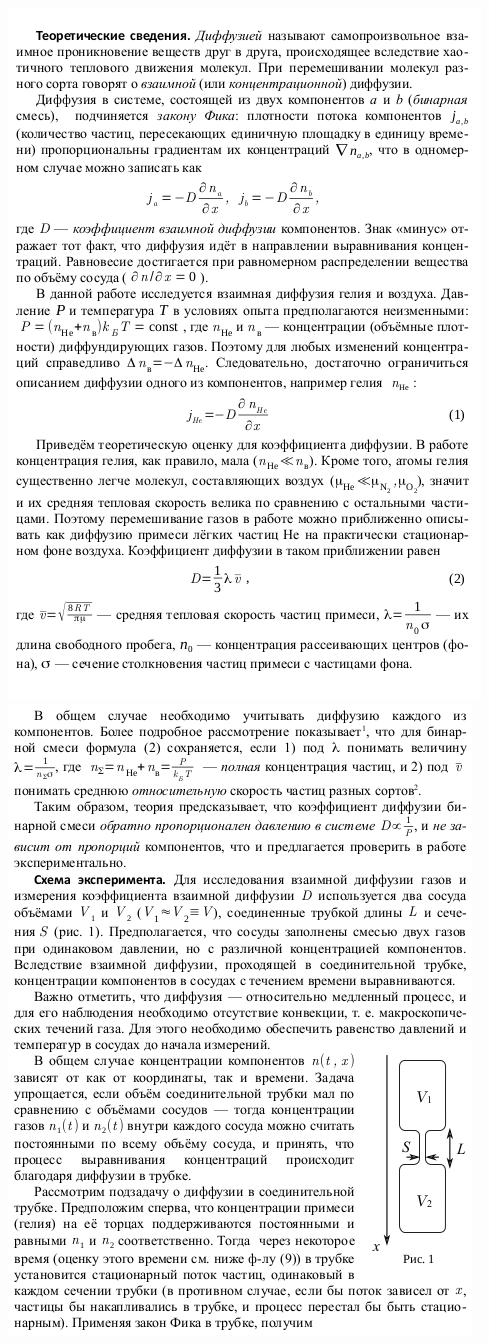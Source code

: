 \documentclass[12pt,a4paper]{article}
\begin{document}
	\includegraphics[scale=1.5]{1.png}
	\newpage
	\includegraphics[scale=1.5]{2.png}
\end{document}
